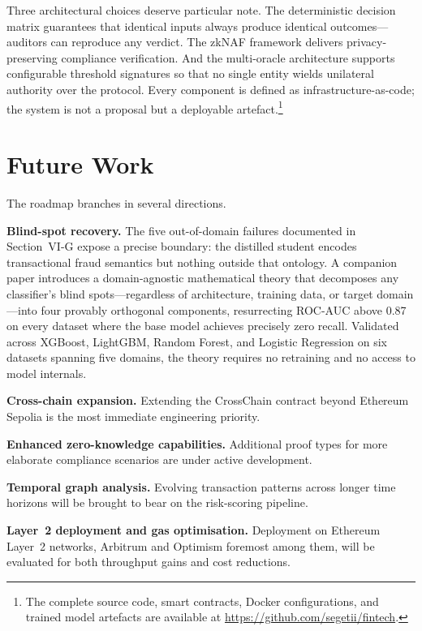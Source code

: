 \documentclass[journal]{IEEEtran}
\begin{document}
Three architectural choices deserve particular note. The deterministic decision matrix guarantees that identical inputs always produce identical outcomes---auditors can reproduce any verdict. The zkNAF framework delivers privacy-preserving compliance verification. And the multi-oracle architecture supports configurable threshold signatures so that no single entity wields unilateral authority over the protocol. Every component is defined as infrastructure-as-code; the system is not a proposal but a deployable artefact.\footnote{The complete source code, smart contracts, Docker configurations, and trained model artefacts are available at \url{https://github.com/segetii/fintech}.}

\section{Future Work}
\label{sec:future}

The roadmap branches in several directions.

\textbf{Blind-spot recovery.} The five out-of-domain failures documented in Section~VI-G expose a precise boundary: the distilled student encodes transactional fraud semantics but nothing outside that ontology. A companion paper introduces a domain-agnostic mathematical theory that decomposes any classifier's blind spots---regardless of architecture, training data, or target domain---into four provably orthogonal components, resurrecting ROC-AUC above 0.87 on every dataset where the base model achieves precisely zero recall. Validated across XGBoost, LightGBM, Random Forest, and Logistic Regression on six datasets spanning five domains, the theory requires no retraining and no access to model internals.

\textbf{Cross-chain expansion.} Extending the CrossChain contract beyond Ethereum Sepolia is the most immediate engineering priority.

\textbf{Enhanced zero-knowledge capabilities.} Additional proof types for more elaborate compliance scenarios are under active development.

\textbf{Temporal graph analysis.} Evolving transaction patterns across longer time horizons will be brought to bear on the risk-scoring pipeline.

\textbf{Layer~2 deployment and gas optimisation.} Deployment on Ethereum Layer~2 networks, Arbitrum and Optimism foremost among them, will be evaluated for both throughput gains and cost reductions.
\end{document}
